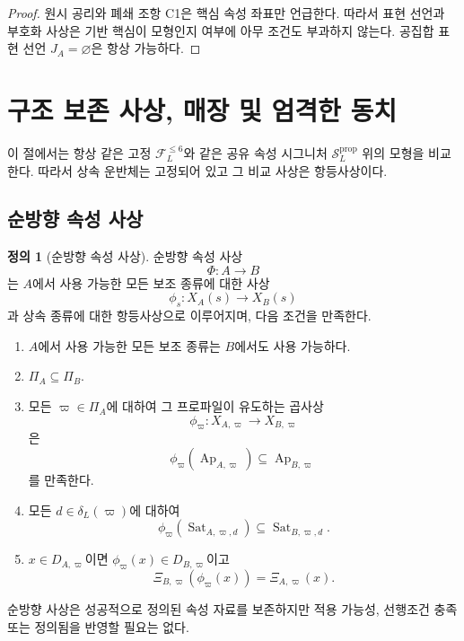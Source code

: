 \documentclass[11pt]{article}
\newcommand{\FVI}{\mathcal F_{L}^{\le 6}}
\newcommand{\Sprop}{\mathcal S_{L}^{\mathrm{prop}}}
\newcommand{\Ap}{\operatorname{Ap}}
\newcommand{\Sat}{\operatorname{Sat}}
\theoremstyle{definition}
\newtheorem{definition}[theorem]{정의}
\theoremstyle{remark}
\begin{document}
\begin{proof}
원시 공리와 폐쇄 조항 C1은 핵심 속성 좌표만 언급한다.
따라서 표현 선언과 부호화 사상은 기반 핵심이 모형인지 여부에 아무 조건도 부과하지 않는다.
공집합 표현 선언 \(J_A=\varnothing\)은 항상 가능하다.
\end{proof}

\section{구조 보존 사상, 매장 및 엄격한 동치}
\label{sec:maps}

이 절에서는 항상 같은 고정 \(\FVI\)와 같은 공유 속성 시그니처 \(\Sprop\) 위의 모형을 비교한다.
따라서 상속 운반체는 고정되어 있고 그 비교 사상은 항등사상이다.

\subsection{순방향 속성 사상}

\begin{definition}[순방향 속성 사상]
\label{def:forward-map}
순방향 속성 사상
\[
\Phi:A\longrightarrow B
\]
는 \(A\)에서 사용 가능한 모든 보조 종류에 대한 사상
\[
\phi_s:X_A(s)\longrightarrow X_B(s)
\]
과 상속 종류에 대한 항등사상으로 이루어지며, 다음 조건을 만족한다.
\begin{enumerate}[label=(F\arabic*)]
\item \(A\)에서 사용 가능한 모든 보조 종류는 \(B\)에서도 사용 가능하다.
\item \(\Pi_A\subseteq\Pi_B\).
\item 모든 \(\varpi\in\Pi_A\)에 대하여 그 프로파일이 유도하는 곱사상
\[
\phi_{\varpi}:X_{A,\varpi}\longrightarrow X_{B,\varpi}
\]
은
\[
\phi_{\varpi}(\Ap_{A,\varpi})\subseteq\Ap_{B,\varpi}
\]
를 만족한다.
\item 모든 \(d\in\delta_L(\varpi)\)에 대하여
\[
\phi_{\varpi}(\Sat_{A,\varpi,d})\subseteq\Sat_{B,\varpi,d}.
\]
\item \(x\in D_{A,\varpi}\)이면 \(\phi_{\varpi}(x)\in D_{B,\varpi}\)이고
\[
\Xi_{B,\varpi}(\phi_{\varpi}(x))=\Xi_{A,\varpi}(x).
\]
\end{enumerate}
\end{definition}

순방향 사상은 성공적으로 정의된 속성 자료를 보존하지만 적용 가능성, 선행조건 충족 또는 정의됨을 반영할 필요는 없다.
\end{document}
